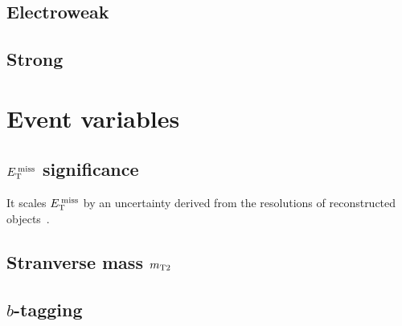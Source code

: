 \subsection{Electroweak}

\subsection{Strong}


\section{Event variables}


\subsection{$E_\mathrm{T}^\mathrm{\:miss}$ significance}
\label{sec:metsig}
It scales $E_\mathrm{T}^\mathrm{\:miss}$ by an uncertainty derived from the resolutions of
reconstructed objects~\cite{atlas_met_significance}.

\subsection{Stranverse mass $m_\mathrm{T2}$}
\label{sec:mt2}

\subsection{$b$-tagging}
\label{sec:btagging}

